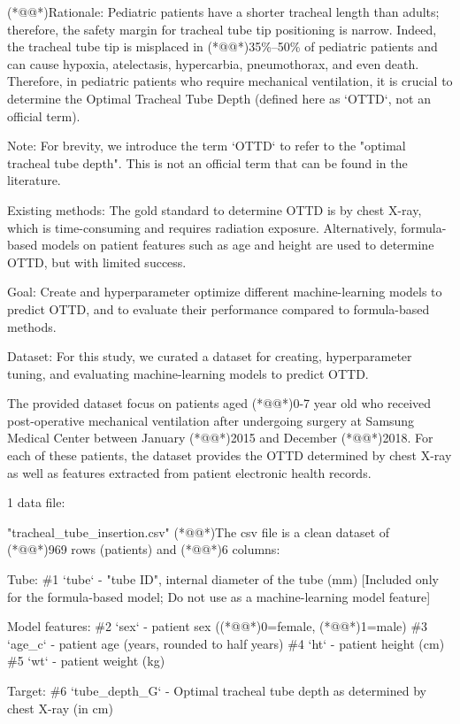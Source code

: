 \documentclass[11pt]{article}
\begin{document}
\begin{codeoutput}
(*@@*)Rationale: Pediatric patients have a shorter tracheal length than adults; therefore, the safety margin for tracheal tube tip positioning is narrow.
Indeed, the tracheal tube tip is misplaced in (*@@*)35\%--50\% of pediatric patients and can cause hypoxia, atelectasis, hypercarbia, pneumothorax, and even death.
Therefore, in pediatric patients who require mechanical ventilation, it is crucial to determine the Optimal Tracheal Tube Depth (defined here as `OTTD`, not an official term).

Note: For brevity, we introduce the term `OTTD` to refer to the "optimal tracheal tube depth". This is not an official term that can be found in the literature.

Existing methods: The gold standard to determine OTTD is by chest X-ray, which is time-consuming and requires radiation exposure.
Alternatively, formula-based models on patient features such as age and height are used to determine OTTD, but with limited success.

Goal: Create and hyperparameter optimize different machine-learning models to predict OTTD, and to evaluate their performance compared to formula-based methods.

Dataset: For this study, we curated a dataset for creating, hyperparameter tuning, and evaluating machine-learning models to predict OTTD.

The provided dataset focus on patients aged (*@@*)0-7 year old who received post-operative mechanical ventilation after undergoing surgery at Samsung Medical Center between January (*@@*)2015 and December (*@@*)2018.
For each of these patients, the dataset provides the OTTD determined by chest X-ray as well as features extracted from patient electronic health records.


1 data file:

"tracheal\_tube\_insertion.csv"
(*@@*)The csv file is a clean dataset of (*@@*)969 rows (patients) and (*@@*)6 columns:

Tube:
\#1 `tube` - "tube ID", internal diameter of the tube (mm) [Included only for the formula-based model; Do not use as a machine-learning model feature]

Model features:
\#2 `sex` - patient sex ((*@@*)0=female, (*@@*)1=male)
\#3 `age\_c` - patient age (years, rounded to half years)
\#4 `ht` - patient height (cm)
\#5 `wt` - patient weight (kg)

Target:
\#6 `tube\_depth\_G` - Optimal tracheal tube depth as determined by chest X-ray (in cm)



\end{codeoutput}
\end{document}
